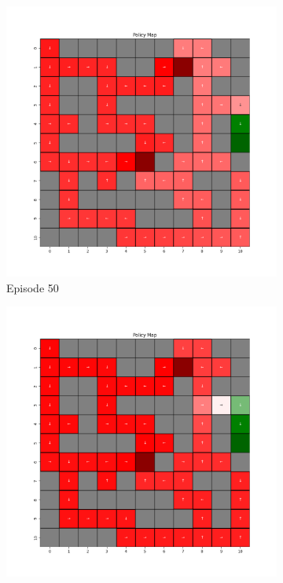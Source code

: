 \documentclass{assignment}
\begin{document}
\begin{figure}[H]
\begin{subfigure}{0.3\textwidth}
        \includegraphics[width=\textwidth]{figures/policy_q/default/policy_alpha_0.1_gamma_0.95_epsilon_0.2_iteration_50.png}
    \caption{Episode 50}
    \end{subfigure}\hfill
    \begin{subfigure}{0.3\textwidth}
        \includegraphics[width=\textwidth]{figures/policy_q/default/policy_alpha_0.1_gamma_0.95_epsilon_0.2_iteration_100.png}

\end{subfigure}
\end{figure}
\end{document}
